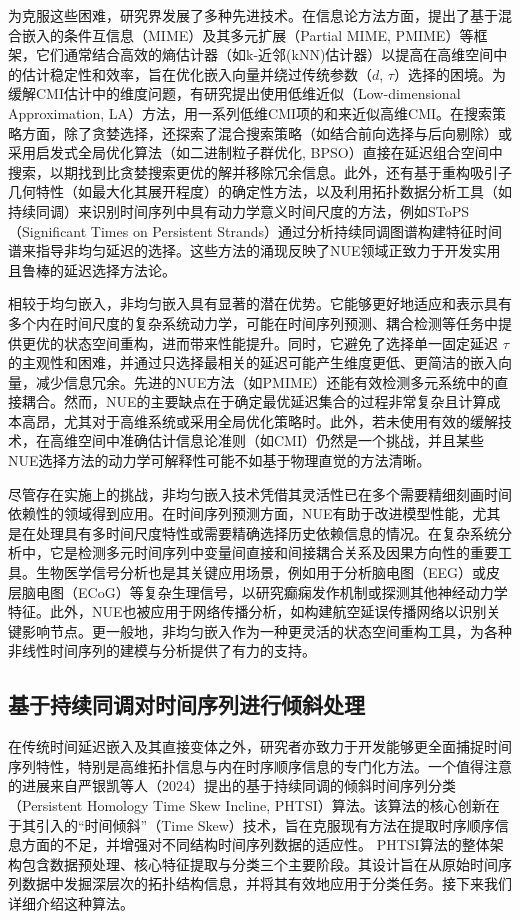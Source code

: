 为克服这些困难，研究界发展了多种先进技术。在信息论方法方面，提出了基于混合嵌入的条件互信息（MIME）及其多元扩展（Partial MIME, PMIME）等框架，它们通常结合高效的熵估计器（如k-近邻(kNN)估计器）以提高在高维空间中的估计稳定性和效率，旨在优化嵌入向量并绕过传统参数（$d$, $\tau$）选择的困境。为缓解CMI估计中的维度问题，有研究提出使用低维近似（Low-dimensional Approximation, LA）方法，用一系列低维CMI项的和来近似高维CMI。在搜索策略方面，除了贪婪选择，还探索了混合搜索策略（如结合前向选择与后向剔除）或采用启发式全局优化算法（如二进制粒子群优化, BPSO）直接在延迟组合空间中搜索，以期找到比贪婪搜索更优的解并移除冗余信息。此外，还有基于重构吸引子几何特性（如最大化其展开程度）的确定性方法，以及利用拓扑数据分析工具（如持续同调）来识别时间序列中具有动力学意义时间尺度的方法，例如SToPS（Significant Times on Persistent Strands）通过分析持续同调图谱构建特征时间谱来指导非均匀延迟的选择。这些方法的涌现反映了NUE领域正致力于开发实用且鲁棒的延迟选择方法论。

相较于均匀嵌入，非均匀嵌入具有显著的潜在优势。它能够更好地适应和表示具有多个内在时间尺度的复杂系统动力学，可能在时间序列预测、耦合检测等任务中提供更优的状态空间重构，进而带来性能提升。同时，它避免了选择单一固定延迟 $\tau$ 的主观性和困难，并通过只选择最相关的延迟可能产生维度更低、更简洁的嵌入向量，减少信息冗余。先进的NUE方法（如PMIME）还能有效检测多元系统中的直接耦合。然而，NUE的主要缺点在于确定最优延迟集合的过程非常复杂且计算成本高昂，尤其对于高维系统或采用全局优化策略时。此外，若未使用有效的缓解技术，在高维空间中准确估计信息论准则（如CMI）仍然是一个挑战，并且某些NUE选择方法的动力学可解释性可能不如基于物理直觉的方法清晰。

尽管存在实施上的挑战，非均匀嵌入技术凭借其灵活性已在多个需要精细刻画时间依赖性的领域得到应用。在时间序列预测方面，NUE有助于改进模型性能，尤其是在处理具有多时间尺度特性或需要精确选择历史依赖信息的情况。在复杂系统分析中，它是检测多元时间序列中变量间直接和间接耦合关系及因果方向性的重要工具。生物医学信号分析也是其关键应用场景，例如用于分析脑电图（EEG）或皮层脑电图（ECoG）等复杂生理信号，以研究癫痫发作机制或探测其他神经动力学特征。此外，NUE也被应用于网络传播分析，如构建航空延误传播网络以识别关键影响节点。更一般地，非均匀嵌入作为一种更灵活的状态空间重构工具，为各种非线性时间序列的建模与分析提供了有力的支持。


\subsection{基于持续同调对时间序列进行倾斜处理}
在传统时间延迟嵌入及其直接变体之外，研究者亦致力于开发能够更全面捕捉时间序列特性，特别是高维拓扑信息与内在时序顺序信息的专门化方法。一个值得注意的进展来自严银凯等人（2024）\cite{JSJC202406009}提出的基于持续同调的倾斜时间序列分类（Persistent Homology Time Skew Incline, PHTSI）算法。该算法的核心创新在于其引入的“时间倾斜”（Time Skew）技术，旨在克服现有方法在提取时序顺序信息方面的不足，并增强对不同结构时间序列数据的适应性。
PHTSI算法的整体架构包含数据预处理、核心特征提取与分类三个主要阶段。其设计旨在从原始时间序列数据中发掘深层次的拓扑结构信息，并将其有效地应用于分类任务。接下来我们详细介绍这种算法。


